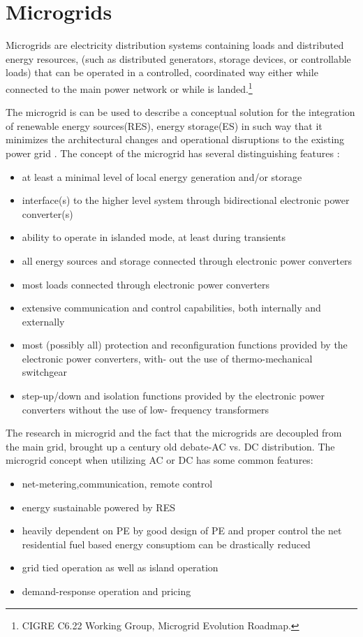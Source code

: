 \documentclass[]{scrartcl}
\newenvironment{definition}[1][Definition]{\begin{trivlist}
		\item[\hskip \labelsep {\bfseries #1}]}{\end{trivlist}}
\begin{document}
\section{Microgrids}

\begin{definition}
	Microgrids are electricity distribution systems containing loads and distributed energy resources, (such as distributed generators, storage devices, or controllable loads) that can be operated in a controlled, coordinated way either while connected to the main power network or while is landed.\footnote{CIGRE C6.22 Working Group, Microgrid Evolution Roadmap.}\cite{Marnay2015}
\end{definition}


The microgrid is can be used to describe a conceptual solution for the integration of renewable energy sources(RES), energy storage(ES) in such way that it minimizes the architectural changes and operational disruptions to the existing power grid \cite{Lasseter2004}. The concept of the microgrid has several distinguishing features \cite{Boroyevich2013}:
\begin{itemize}
	\item at least a minimal level of local energy generation and/or storage
	\item interface(s) to the higher level system through bidirectional electronic power converter(s)
	\item ability to operate in islanded mode, at least during transients
	\item all energy sources and storage connected through electronic power converters
	\item most loads connected through electronic power converters
	\item extensive communication and control capabilities, both internally and externally
	\item most (possibly all) protection and reconfiguration functions provided by the electronic power converters, with- out the use of thermo-mechanical switchgear
	\item step-up/down and isolation functions provided by the electronic power converters without the use of low- frequency transformers
\end{itemize}


The research in microgrid and the fact that the microgrids are decoupled from the main grid, brought up a century old debate-AC vs. DC distribution.  The microgrid concept when utilizing AC or DC has some common features:
\begin{itemize}
	\item net-metering,communication, remote control
	\item energy sustainable powered by RES
	\item heavily dependent on PE
	\subitem by good design of PE and proper control the net residential fuel based energy consuptiom can be drastically reduced
	\item grid tied operation as well as island operation
	\item demand-response operation and pricing
\end{itemize}
\end{document}
